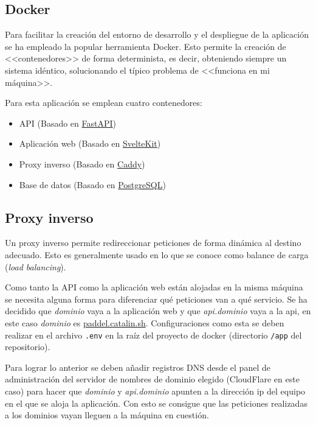 \subsection{Docker}

Para facilitar la creación del entorno de desarrollo y el despliegue de la
aplicación se ha empleado la popular herramienta Docker. Esto permite la
creación de <<contenedores>> de forma determinista, es decir, obteniendo siempre
un sistema idéntico, solucionando el típico problema de <<funciona en mi
máquina>>.

Para esta aplicación se emplean cuatro contenedores:

\begin{itemize}
    \item API (Basado en \href{https://fastapi.tiangolo.com/}{FastAPI})
    \item Aplicación web (Basado en \href{https://kit.svelte.dev/}{SvelteKit})
    \item Proxy inverso (Basado en \href{https://caddyserver.com/}{Caddy})
    \item Base de datos (Basado en \href{https://www.postgresql.org/}{PostgreSQL})
\end{itemize}

\subsection{Proxy inverso}

Un proxy inverso permite redireccionar peticiones de forma dinámica al destino
adecuado. Esto es generalmente usado en lo que se conoce como balance de carga
(\textit{load balancing}).

Como tanto la API como la aplicación web están alojadas en la misma máquina se
necesita alguna forma para diferenciar qué peticiones van a qué servicio. Se ha
decidido que \textit{dominio} vaya a la aplicación web y que
\textit{api.dominio} vaya a la api, en este caso \textit{dominio} es
\href{https://paddel.catalin.sh}{paddel.catalin.sh}. Configuraciones como esta
se deben realizar en el archivo \texttt{.env} en la raíz del proyecto de docker
(directorio \texttt{/app} del repositorio).

Para lograr lo anterior se deben añadir registros DNS desde el panel de
administración del servidor de nombres de dominio elegido (CloudFlare en este
caso) para hacer que \textit{dominio} y \textit{api.dominio} apunten a la
dirección ip del equipo en el que se aloja la aplicación. Con esto se consigue
que las peticiones realizadas a los dominios vayan lleguen a la máquina en
cuestión.

